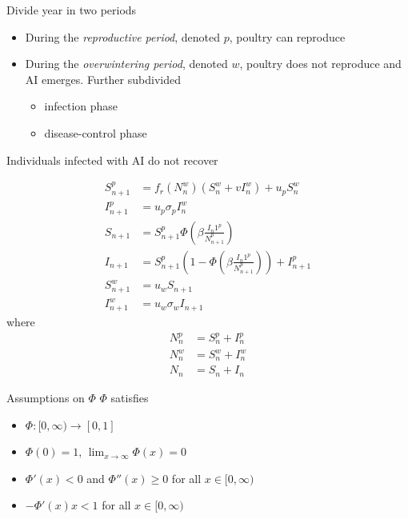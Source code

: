 \documentclass[aspectratio=43]{beamer}
\begin{document}

\begin{frame}{Divide year in two periods}
  \begin{itemize}
    \item During the \emph{reproductive period}, denoted $p$, poultry can reproduce
    \vfill
    \item During the \emph{overwintering period}, denoted $w$, poultry does not reproduce and AI emerges. Further subdivided
    \begin{itemize}
      \item infection phase
      \item disease-control phase
    \end{itemize}
  \end{itemize}
  \vfill
  Individuals infected with AI do not recover
\end{frame}

\begin{frame}
  \begin{align*}
  S_{n+1}^p &= f_r(N_n^w)(S_n^w+vI_n^w)+u_pS_n^w \\
  I_{n+1}^p &= u_p\sigma_pI_n^w \\
  S_{n+1} &= S_{n+1}^p\Phi\left(
    \beta\frac{I_{n}1^p}{N_{n+1}^p}
  \right) \\
  I_{n+1} &= S_{n+1}^p\left(1-\Phi\left(
    \beta\frac{I_{n}1^p}{N_{n+1}^p}
  \right)\right)+I_{n+1}^p \\
  S_{n+1}^w &= u_wS_{n+1} \\
  I_{n+1}^w &= u_w\sigma_wI_{n+1}
  \end{align*}
  where
  \begin{align*}
    N_n^p &= S_n^p+I_n^p \\
    N_n^w &= S_n^w+I_n^w \\
    N_n &= S_n+I_n 
  \end{align*}
\end{frame}

\begin{frame}{Assumptions on $\Phi$}
  $\Phi$ satisfies
  \begin{itemize}
    \item $\Phi:[0,\infty)\to[0,1]$
    \item $\Phi(0)=1$, $\lim_{x\to\infty}\Phi(x)=0$
    \item $\Phi'(x)<0$ and $\Phi''(x)\geq 0$ for all $x\in[0,\infty)$
    \item $-\Phi'(x)x<1$ for all $x\in[0,\infty)$
  \end{itemize}
\end{frame}
\end{document}
